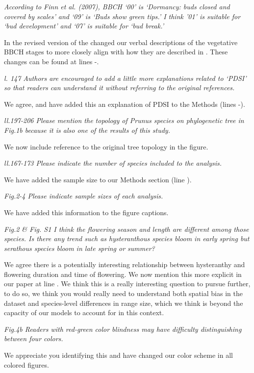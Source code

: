\documentclass{article}[12pt]
\begin{document}
\emph{According to Finn et al. (2007), BBCH ‘00’ is ‘Dormancy: buds closed and covered by scales’ and ‘09’ is ‘Buds show green tips.’ I think ’01’ is suitable for ‘bud development’ and ‘07’ is suitable for ‘bud break.’}

In the revised version of the changed our verbal descriptions of the vegetative BBCH stages to more closely align with how they are described in \citet{Finn2007}. These changes can be found at lines -.

\emph{l. 147 Authors are encouraged to add a little more explanations related to ‘PDSI’ so that readers can understand it without referring to the original references.}

We agree, and have added this an explanation of PDSI to the Methods (lines -).

\emph{ll.197-206 Please mention the topology of Prunus species on phylogenetic tree in Fig.1b because it is also one of the results of this study.}

We now include reference to the original tree topology in the figure.

\emph{ll.167-173 Please indicate the number of species included to the analysis.}

We have added the sample size to our Methods section (line ).

\emph{Fig.2-4 Please indicate sample sizes of each analysis.}

We have added this information to the figure captions.

\emph{Fig.2 & Fig. S1 I think the flowering season and length are different among those species. Is there any trend such as hysteranthous species bloom in early spring but serathous species bloom in late spring or summer?}

We agree there is a potentially interesting relationship between hysteranthy and flowering duration and time of flowering. We now mention this more explicit in our paper at line . We think this is a really interesting question to pursue further, to do so, we think you would really need to understand both spatial bias in the dataset and  species-level differences in range size, which we think is beyond the capacity of our models to account for in this context. 

\emph{Fig.4b Readers with red-green color blindness may have difficulty distinguishing between four colors.}

We appreciate you identifying this and have changed our color scheme in all colored figures.
\end{document}

